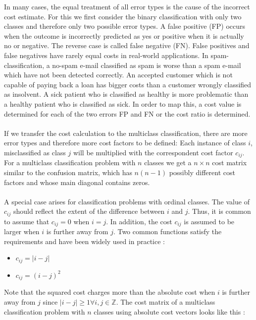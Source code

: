 \documentclass[article,type=msc,colorback,accentcolor=tud7b]{tudthesis}
\begin{document}
    In many cases, the equal treatment of all error types is the cause of the incorrect cost estimate. For this we first consider the binary classification with only two classes and therefore only two possible error types. A false positive (FP) occurs when the outcome is incorrectly predicted as yes or positive when it is actually no or negative. The reverse case is called false negative (FN). False positives and false negatives have rarely equal costs in real-world applications. In spam-classification, a no-spam e-mail classified as spam is worse than a spam e-mail which have not been detected correctly. An accepted customer which is not capable of paying back a loan has bigger costs than a customer wrongly classified as insolvent. A sick patient who is classified as healthy is more problematic than a healthy patient who is classified as sick. In order to map this, a cost value is determined for each of the two errors FP and FN or the cost ratio is determined. \\\\
    If we transfer the cost calculation to the multiclass classification, there are more error types and therefore more cost factors to be defined: Each instance of class $i$, misclassified as class $j$ will be multiplied with the correspondent cost factor $c_{ij}$. For a multiclass classification problem with $n$ classes we get a $n\times n$ cost matrix similar to the confusion matrix, which has $n(n-1)$ possibly different cost factors and whose main diagonal contains zeros. \\\\
    A special case arises for classification problems with ordinal classes. The value of $c_{ij}$ should reflect the extent of the difference between $i$ and $j$. Thus, it is common to assume that $c_{ij}=0$ when $i=j$. In addition, the cost $c_{ij}$ is assumed to be larger when $i$ is further away from $j$. Two common functions satisfy the requirements and have been widely used in practice \autocite[Section~3.1]{Ruan2014}:
    \begin{itemize}
      \item {} $c_{ij}=\left|i-j\right|$
      \item {} $c_{ij}=\left(i-j\right)^{2}$
    \end{itemize}
    Note that the squared cost charges more than the absolute cost when $i$ is further away from $j$ since $\left|i-j\right|\geq1\forall i,j\in\mathbb{Z}$. The cost matrix of a multiclass classification problem with $n$ classes using absolute cost vectors looks like this \autocite[Section~3]{Kotsiantis2004}:
\end{document}
